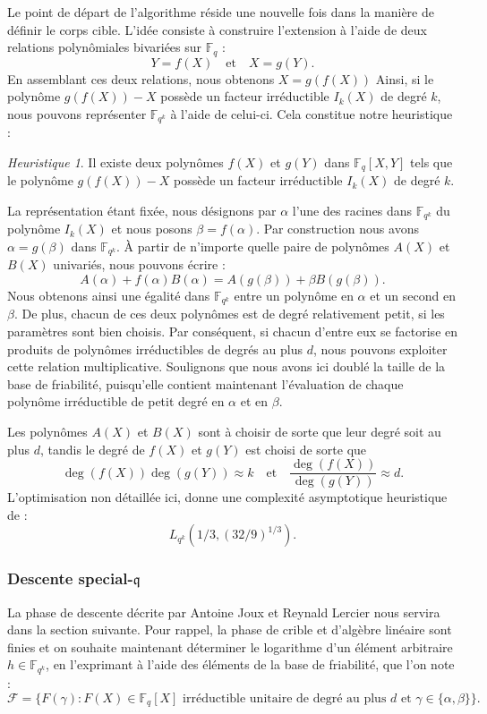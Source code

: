 \documentclass[a4paper, titlepage, 11pt]{article}
\theoremstyle{definition}
\theoremstyle{remark}
\newtheorem{heur}[theo]{Heuristique}
\def\gf #1{\mathbb{F}_{#1}}
\begin{document}
Le point de départ de l'algorithme réside une nouvelle fois dans la manière de définir le corps cible. L'idée consiste à construire l'extension à l'aide de deux relations polynômiales bivariées sur $\gf{q}$ : $$Y = f(X) \quad \text{et}\quad X = g(Y).$$
En assemblant ces deux relations, nous obtenons $X = g(f(X))$ Ainsi, si le polynôme $g(f(X)) - X$ possède un facteur irréductible $I_k(X)$ de degré $k$, nous pouvons représenter $\gf{q^k}$ à l'aide de celui-ci. Cela constitue notre heuristique :
\begin{heur}
Il existe deux polynômes $f(X)$ et $g(Y)$ dans $\gf{q}[X, Y]$ tels que le polynôme $g(f(X)) - X$ possède un facteur irréductible $I_k(X)$ de degré $k$.
\end{heur}
La représentation étant fixée, nous désignons par $\alpha$ l'une des racines dans $\gf{q^k}$ du polynôme $I_k(X)$ et nous posons $\beta = f(\alpha)$. Par construction nous avons $\alpha = g(\beta)$ dans $\gf{q^k}$. À partir de n'importe quelle paire de polynômes $A(X)$ et $B(X)$ univariés, nous pouvons écrire :
$$A(\alpha) + f(\alpha)B(\alpha) = A(g(\beta)) + \beta B(g(\beta)).$$
Nous obtenons ainsi une égalité dans $\gf{q^k}$ entre un polynôme en $\alpha$ et un second en $\beta$. De plus, chacun de ces deux polynômes est de degré relativement petit, si les paramètres sont bien choisis. Par conséquent, si chacun d'entre eux se factorise en produits de polynômes irréductibles de degrés au plus $d$, nous pouvons exploiter cette relation multiplicative. Soulignons que nous avons ici doublé la taille de la base de friabilité, puisqu'elle contient maintenant l'évaluation de chaque polynôme irréductible de petit degré en $\alpha$ et en $\beta$.

Les polynômes $A(X)$ et $B(X)$ sont à choisir de sorte que leur degré soit au plus $d$, tandis le degré de $f(X)$ et $g(Y)$ est choisi de sorte que $$\deg(f(X)) \deg(g(Y)) \approx k \quad\text{et}\quad \frac{\deg(f(X))}{\deg(g(Y))} \approx d.$$
L'optimisation non détaillée ici, donne une complexité asymptotique heuristique de :
$$L_{q^k}(1/3, (32/9)^{1/3}).$$

\subsubsection{Descente special-$\mathfrak{q}$}\label{ss-sec:special-q}

La phase de descente décrite par Antoine Joux et Reynald Lercier \cite{joux2006, joux2002} nous servira dans la section suivante. Pour rappel, la phase de crible et d'algèbre linéaire sont finies et on souhaite maintenant déterminer le logarithme d'un élément arbitraire $h\in\gf{q^k}$, en l'exprimant à l'aide des éléments de la base de friabilité, que l'on note :
$$\mathcal{F} =  \{F(\gamma) : F(X) \in \gf{q}[X] \text{ irréductible unitaire de degré au plus } d \text{ et } \gamma \in \{\alpha, \beta\}\}.$$ 
\end{document}

